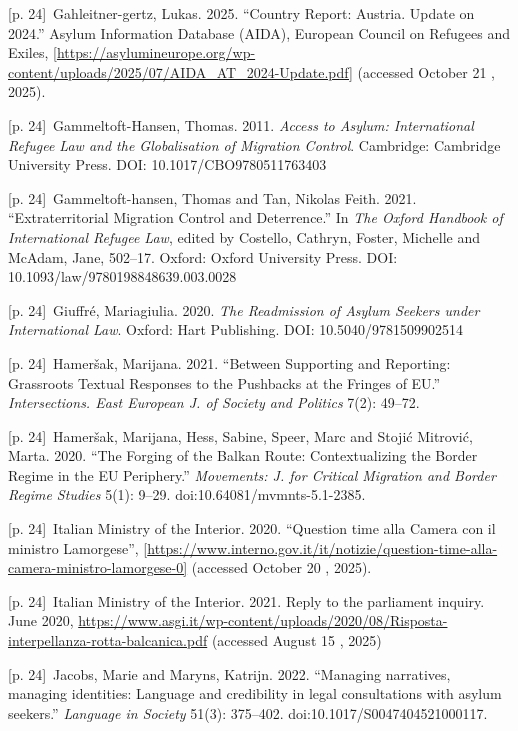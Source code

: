 \documentclass[10pt,a4paper]{article}
\begin{document}
{\scriptsize\color{gray} [p. 24]}\ Gahleitner-gertz, Lukas. 2025. “Country Report: Austria. Update on 2024.” Asylum Information Database (AIDA), European Council on Refugees and Exiles, [\url{https://asylumineurope.org/wp-content/uploads/2025/07/AIDA_AT_2024-Update.pdf]} (accessed October 21 , 2025).\par
{\scriptsize\color{gray} [p. 24]}\ Gammeltoft-Hansen, Thomas. 2011. \textit{Access to Asylum: International Refugee Law and the Globalisation of Migration Control}. Cambridge: Cambridge University Press. DOI: 10.1017/CBO9780511763403\par
{\scriptsize\color{gray} [p. 24]}\ Gammeltoft-hansen, Thomas and Tan, Nikolas Feith. 2021. “Extraterritorial Migration Control and Deterrence.” In \textit{The Oxford Handbook of International Refugee Law}, edited by Costello, Cathryn, Foster, Michelle and McAdam, Jane, 502–17. Oxford: Oxford University Press. DOI: 10.1093/law/9780198848639.003.0028\par
{\scriptsize\color{gray} [p. 24]}\ Giuffré, Mariagiulia. 2020. \textit{The Readmission of Asylum Seekers under International Law}. Oxford: Hart Publishing. DOI: 10.5040/9781509902514\par
{\scriptsize\color{gray} [p. 24]}\ Hameršak, Marijana. 2021. “Between Supporting and Reporting: Grassroots Textual Responses to the Pushbacks at the Fringes of EU.” \textit{Intersections. East European J. of Society and Politics} 7(2): 49–72.\par
{\scriptsize\color{gray} [p. 24]}\ Hameršak, Marijana, Hess, Sabine, Speer, Marc and Stojić Mitrović, Marta. 2020. “The Forging of the Balkan Route: Contextualizing the Border Regime in the EU Periphery.” \textit{Movements: J. for Critical Migration and Border Regime Studies} 5(1): 9–29. doi:10.64081/mvmnts-5.1-2385.\par
{\scriptsize\color{gray} [p. 24]}\ Italian Ministry of the Interior. 2020. “Question time alla Camera con il ministro Lamorgese”, [\url{https://www.interno.gov.it/it/notizie/question-time-alla-camera-ministro-lamorgese-0]} (accessed October 20 , 2025).\par
{\scriptsize\color{gray} [p. 24]}\ Italian Ministry of the Interior. 2021. Reply to the parliament inquiry. June 2020, \url{https://www.asgi.it/wp-content/uploads/2020/08/Risposta-interpellanza-rotta-balcanica.pdf} (accessed August 15 , 2025)\par
{\scriptsize\color{gray} [p. 24]}\ Jacobs, Marie and Maryns, Katrijn. 2022. “Managing narratives, managing identities: Language and credibility in legal consultations with asylum seekers.” \textit{Language in Society} 51(3): 375–402. doi:10.1017/S0047404521000117.\par
\end{document}
